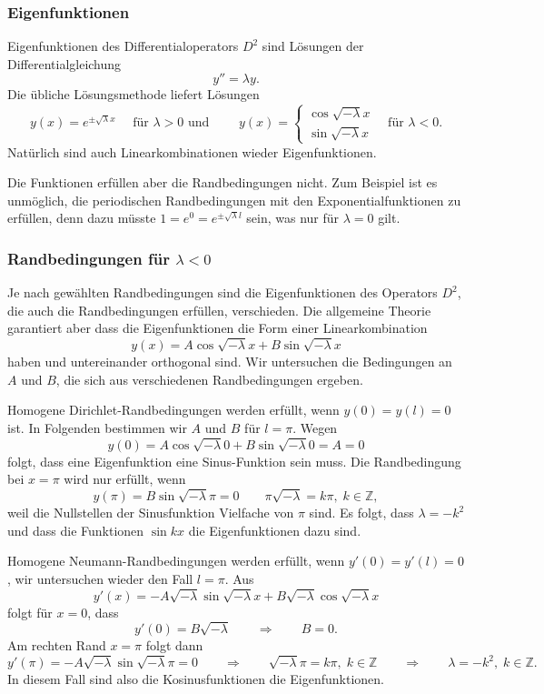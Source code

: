 %
%
\subsubsection{Eigenfunktionen}
Eigenfunktionen des Differentialoperators $D^2$ sind Lösungen der
Differentialgleichung
\[
y'' = \lambda y.
\]
Die übliche Lösungsmethode liefert Lösungen
\[
y(x) = e^{\pm\!\sqrt{\lambda} x} \quad
\text{ für $\lambda > 0$ und }
\qquad
y(x)
=
\begin{cases}
\cos\sqrt{-\lambda} x \\
\sin\sqrt{-\lambda} x
\end{cases}
\quad\text{für $\lambda < 0$.}
\]
Natürlich sind auch Linearkombinationen wieder Eigenfunktionen.

Die Funktionen erfüllen aber die Randbedingungen nicht.
Zum Beispiel ist es unmöglich, die periodischen Randbedingungen
mit den Exponentialfunktionen zu erfüllen, denn dazu müsste
$1=e^{0}=e^{\pm\!\sqrt{\lambda}l}$ sein, was nur für $\lambda=0$
gilt.

%
%
\subsubsection{Randbedingungen für $\lambda<0$}
Je nach gewählten Randbedingungen sind die Eigenfunktionen des Operators
$D^2$, die auch die Randbedingungen erfüllen, verschieden.
Die allgemeine Theorie garantiert aber dass die Eigenfunktionen die
Form einer Linearkombination
\begin{equation}
y(x)
=
A\cos \sqrt{-\lambda}x
+
B\sin \sqrt{-\lambda}x
\label{buch:orthofkt:pde:periodisch}
\end{equation}
haben und untereinander orthogonal sind.
Wir untersuchen die Bedingungen an $A$ und $B$, die sich aus verschiedenen
Randbedingungen ergeben.

Homogene Dirichlet-Randbedingungen werden erfüllt, wenn $y(0)=y(l)=0$ ist.
In Folgenden bestimmen wir $A$ und $B$ für $l=\pi$.
Wegen
\[
y(0)
=
A\cos \sqrt{-\lambda}0
+
B\sin \sqrt{-\lambda}0
=
A
=
0
\]
folgt, dass eine Eigenfunktion eine Sinus-Funktion sein muss.
Die Randbedingung bei $x=\pi$ wird nur erfüllt, wenn
\[
y(\pi)
=
B\sin\sqrt{-\lambda}\pi
=
0
\qquad
\pi\sqrt{-\lambda}
=
k\pi,\; k\in\mathbb{Z},
\]
weil die Nullstellen der Sinusfunktion Vielfache von $\pi$ sind.
Es folgt, dass $\lambda = -k^2$ und dass die Funktionen $\sin kx$
die Eigenfunktionen dazu sind.

Homogene Neumann-Randbedingungen werden erfüllt, wenn $y'(0)=y'(l)=0$,
wir untersuchen wieder den Fall $l=\pi$.
Aus
\[
y'(x)
=
-A\sqrt{-\lambda}\sin\sqrt{-\lambda} x 
+
B\sqrt{-\lambda}\cos\sqrt{-\lambda} x 
\]
folgt für $x=0$, dass
\[
y'(0)
=
B\sqrt{-\lambda}
\qquad\Rightarrow\qquad B=0.
\]
Am rechten Rand $x=\pi$ folgt dann
\[
y'(\pi)
=
-A\sqrt{-\lambda}\sin\sqrt{-\lambda}\pi
=
0
\qquad\Rightarrow\qquad
\sqrt{-\lambda}\pi = k\pi,\; k\in\mathbb{Z}
\qquad\Rightarrow\qquad
\lambda=-k^2,\;k\in\mathbb{Z}.
\]
In diesem Fall sind also die Kosinusfunktionen die Eigenfunktionen.

